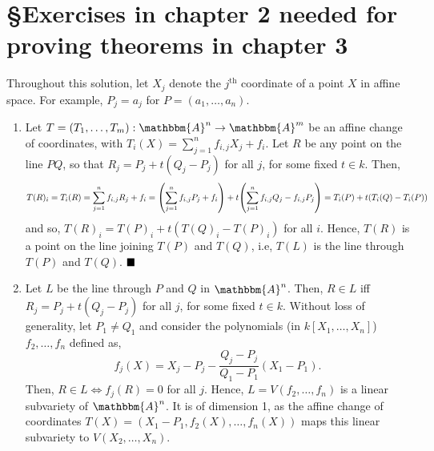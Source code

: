 \documentclass[12pt]{article}
\begin{document}
\pagebreak

\section*{\S Exercises in chapter 2 needed for proving theorems in chapter 3}

\textcolor{maroon}{}Throughout this solution, let \( X_j \) denote the \( {j }^{\text{th}} \) coordinate of a point \( X \) in affine space. For example, \( P_j = a_j \) for \( P = (a_1, \dots, a_n) \).

\begin{enumerate}[label = (\alph*)]
    \item Let \( T = (T_1, \dots, T_m): \mathbbm{A}^n \to \mathbbm{A}^m \) be an affine change of coordinates, with \( T_i(X) = \sum_{j=1}^{n}f_{i,j}X_j + f_i \). Let \( R \) be any point on the line \( PQ \), so that \( R_j = P_j + t(Q_j-P_j) \) for all \( j \), for some fixed \( t \in k \). Then,
          \[
              T(R)_i = T_i(R) = \sum_{j=1}^{n}f_{i,j}R_j + f_i = \qty(\sum_{j=1}^{n}f_{i,j}P_j + f_i) + t \qty(\sum_{j=1}^{n}f_{i,j}Q_j - f_{i,j}P_j) = T_i(P) + t(T_i(Q)-T_i(P))
          \]
          and so, \( T(R)_i = T(P)_i + t(T(Q)_i-T(P)_i) \) for all \( i \). Hence, \( T(R) \) is a point on the line joining \( T(P) \) and \( T(Q) \), i.e, \( T(L) \) is the line through \( T(P) \) and \( T(Q) \). \(\hfill \blacksquare\)
          \smallskip

    \item Let \( L \) be the line through \( P \) and \( Q \) in \( \mathbbm{A}^n \). Then, \( R \in L \) iff \( R_j = P_j + t(Q_j-P_j) \) for all \( j \), for some fixed \( t \in k \). Without loss of generality, let \( P_1 \neq Q_1 \) and consider the polynomials (in \( k[X_1, \dots, X_n] \)) \( f_2, \dots, f_n \) defined as,
          \[
              f_j(X) = X_j - P_j - \frac{Q_j-P_j}{Q_1-P_1}(X_1-P_1).
          \]
          Then, \( R \in L \iff f_j(R) = 0 \) for all \( j \). Hence, \( L = V(f_2, \dots, f_n) \) is a linear subvariety of \( \mathbbm{A}^n \). It is of dimension 1, as the affine change of coordinates \( T(X) = (X_1-P_1, f_2(X), \dots, f_n(X)) \) maps this linear subvariety to \( V(X_2, \dots, X_n) \).
          \smallskip


\end{enumerate}
\end{document}

